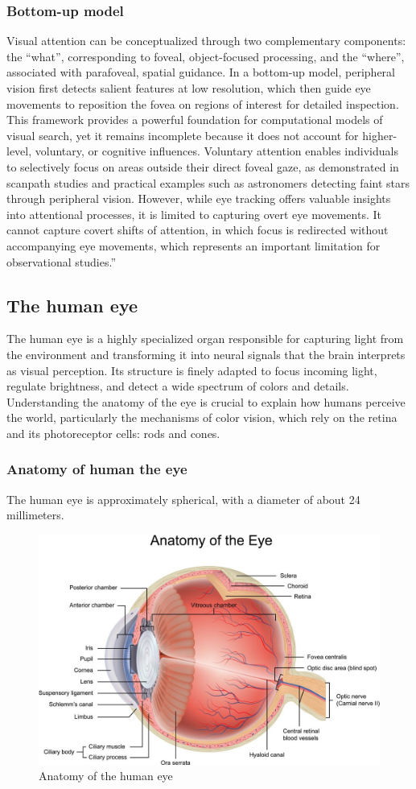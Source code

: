 \documentclass{article}
\begin{document}
\subsubsection{Bottom-up model}
Visual attention can be conceptualized through two complementary components: the “what”, corresponding to foveal, object-focused processing, and the “where”, associated with parafoveal, spatial guidance.
In a bottom-up model, peripheral vision first detects salient features at low resolution, which then guide eye movements to reposition the fovea on regions of interest for detailed inspection.
This framework provides a powerful foundation for computational models of visual search, yet it remains incomplete because it does not account for higher-level, voluntary, or cognitive influences.
Voluntary attention enables individuals to selectively focus on areas outside their direct foveal gaze, as demonstrated in scanpath studies and practical examples such as astronomers detecting faint stars through peripheral vision. 
However, while eye tracking offers valuable insights into attentional processes, it is limited to capturing overt eye movements. 
It cannot capture covert shifts of attention, in which focus is redirected without accompanying eye movements, which represents an important limitation for observational studies.”

\subsection{The human eye}

The human eye is a highly specialized organ responsible for capturing light from the environment and transforming it into neural signals that the brain interprets as visual perception.
Its structure is finely adapted to focus incoming light, regulate brightness, and detect a wide spectrum of colors and details.
Understanding the anatomy of the eye is crucial to explain how humans perceive the world, particularly the mechanisms of color vision, which rely on the retina and its photoreceptor cells: rods and cones.

\subsubsection{Anatomy of human the eye}

The human eye is approximately spherical, with a diameter of about 24 millimeters. 

\begin{figure}[ht]
    \centering
    \includegraphics[width = 0.6
    \textwidth]{Images/Theory/occhio.jpg}
    \caption{Anatomy of the human eye}
    \label{fig:ana}
\end{figure}
\end{document}

